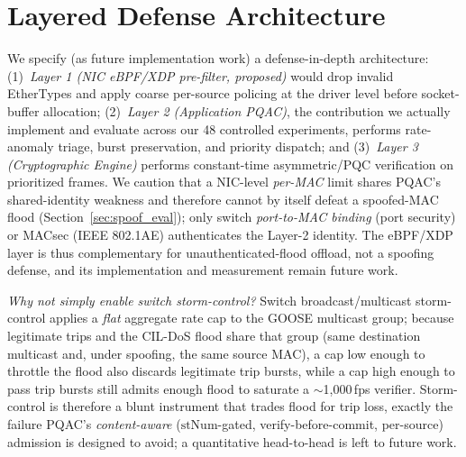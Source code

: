 \documentclass[journal]{IEEEtran}
\begin{document}
\section{Layered Defense Architecture}
\label{sec:defense}
We specify (as future implementation work) a defense-in-depth architecture: (1)~\emph{Layer 1 (NIC eBPF/XDP pre-filter, proposed)} would drop invalid EtherTypes and apply coarse per-source policing at the driver level before socket-buffer allocation; (2)~\emph{Layer 2 (Application PQAC)}, the contribution we actually implement and evaluate across our 48 controlled experiments, performs rate-anomaly triage, burst preservation, and priority dispatch; and (3)~\emph{Layer 3 (Cryptographic Engine)} performs constant-time asymmetric/PQC verification on prioritized frames. We caution that a NIC-level \emph{per-MAC} limit shares PQAC's shared-identity weakness and therefore cannot by itself defeat a spoofed-MAC flood (Section~\ref{sec:spoof_eval}); only switch \emph{port-to-MAC binding} (port security) or MACsec (IEEE 802.1AE) authenticates the Layer-2 identity. The eBPF/XDP layer is thus complementary for unauthenticated-flood offload, not a spoofing defense, and its implementation and measurement remain future work.

\emph{Why not simply enable switch storm-control?} Switch broadcast/multicast storm-control applies a \emph{flat} aggregate rate cap to the GOOSE multicast group; because legitimate trips and the CIL-DoS flood share that group (same destination multicast and, under spoofing, the same source MAC), a cap low enough to throttle the flood also discards legitimate trip bursts, while a cap high enough to pass trip bursts still admits enough flood to saturate a $\sim$1{,}000\,fps verifier. Storm-control is therefore a blunt instrument that trades flood for trip loss, exactly the failure PQAC's \emph{content-aware} ($\text{stNum}$-gated, verify-before-commit, per-source) admission is designed to avoid; a quantitative head-to-head is left to future work.

\end{document}
